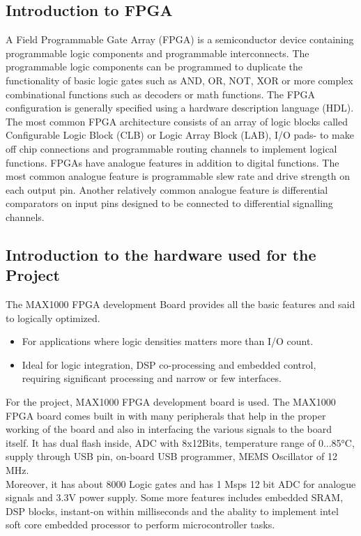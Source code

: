 \documentclass[12pt,a4paper]{article}
\begin{document}
\subsection{Introduction to FPGA }
A Field Programmable Gate Array (FPGA) is a semiconductor device containing programmable logic components and programmable interconnects. The programmable logic components can be programmed to duplicate the functionality of basic logic gates such as AND, OR, NOT, XOR or more complex combinational functions such as decoders or math functions. The FPGA configuration is generally specified using a hardware description language (HDL). The most common FPGA architecture consists of an array of logic blocks called Configurable Logic Block (CLB) or Logic Array Block (LAB), I/O pads- to make off chip connections and programmable routing channels to implement logical functions. FPGAs have analogue features in addition to digital functions. The most common analogue feature is programmable slew rate and drive strength on each output pin. Another relatively common analogue feature is differential comparators on input pins designed to be connected to differential signalling channels.\\


\subsection{Introduction to the hardware used for the Project}
The MAX1000 FPGA development Board provides all the basic features and said to logically optimized.
\begin{itemize}

\item For applications where logic densities matters more than I/O count.\
\item Ideal for logic integration, DSP co-processing and embedded control, requiring significant processing and narrow or few interfaces.
\end{itemize}

For the project, MAX1000 FPGA development board is used. The MAX1000 FPGA board comes built in with many peripherals that help in the proper working of the board and also in interfacing the various signals to the board itself. It has dual flash inside, ADC with 8x12Bits, temperature range of 0...85°C, supply through USB pin, on-board USB programmer, MEMS Oscillator of 12 MHz. \\

Moreover, it has about 8000 Logic gates and has 1 Msps 12 bit ADC for analogue signals and 3.3V power supply. Some more features includes embedded SRAM, DSP blocks, instant-on within milliseconds and the abality to implement intel soft core embedded processor to perform microcontroller tasks. \\
\end{document}

